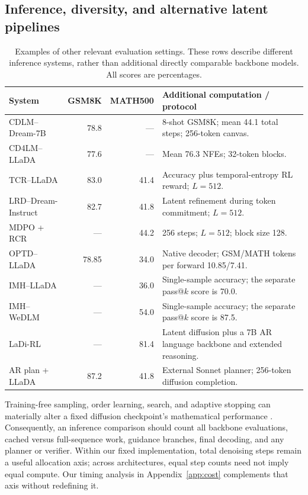 \subsection{Inference, diversity, and alternative latent pipelines}
\begin{table}[ht]
\caption{Examples of other relevant evaluation settings. These rows describe different inference systems, rather than additional directly comparable backbone models. All scores are percentages.}
\label{tab:literatureinference}
\centering\small
\setlength{\tabcolsep}{4pt}
\begin{tabular}{lrrp{5.0cm}}
\toprule
System & GSM8K & MATH500 & Additional computation / protocol\\
\midrule
CDLM--Dream-7B \citep{cdlm} & 78.8 & --- & 8-shot GSM8K; mean 44.1 total steps; 256-token canvas.\\
CD4LM--LLaDA \citep{cd4lm} & 77.6 & --- & Mean 76.3 NFEs; 32-token blocks.\\
TCR--LLaDA \citep{midtruth} & 83.0 & 41.4 & Accuracy plus temporal-entropy RL reward; $L=512$.\\
LRD--Dream-Instruct \citep{lrd} & 82.7 & 41.8 & Latent refinement during token commitment; $L=512$.\\
MDPO + RCR \citep{mdpo} & --- & 44.2 & 256 steps; $L=512$; block size 128.\\
OPTD--LLaDA \citep{optd} & 78.85 & 34.0 & Native decoder; GSM/MATH tokens per forward 10.85/7.41.\\
IMH--LLaDA \citep{qualityexploration} & --- & 36.0 & Single-sample accuracy; the separate pass@$k$ score is 70.0.\\
IMH--WeDLM \citep{qualityexploration} & --- & 54.0 & Single-sample accuracy; the separate pass@$k$ score is 87.5.\\
LaDi-RL \citep{ladirl} & --- & 81.4 & Latent diffusion plus a 7B AR language backbone and extended reasoning.\\
AR plan + LLaDA \citep{arplan} & 87.2 & 41.8 & External Sonnet planner; 256-token diffusion completion.\\
\bottomrule
\end{tabular}
\end{table}

Training-free sampling, order learning, search, and adaptive stopping can materially alter a fixed diffusion checkpoint's mathematical performance \citep{fastdllm,unmasking,ots,sas,adas}. Consequently, an inference comparison should count all backbone evaluations, cached versus full-sequence work, guidance branches, final decoding, and any planner or verifier. Within our fixed implementation, total denoising steps remain a useful allocation axis; across architectures, equal step counts need not imply equal compute. Our timing analysis in Appendix~\ref{app:cost} complements that axis without redefining it.

